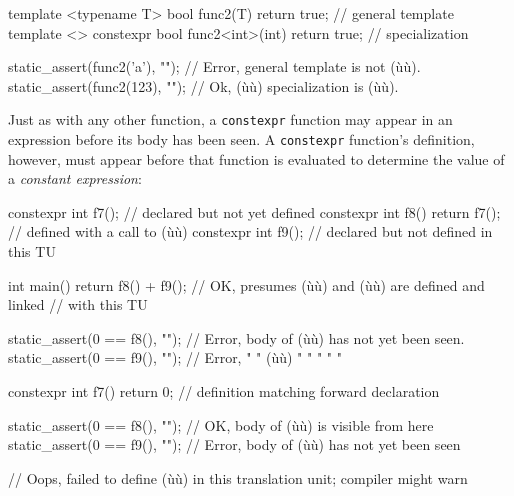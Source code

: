 \begin{emcppslisting}
template <typename T> bool func2(T)        { return true; }  // general template
template <> constexpr bool func2<int>(int) { return true; }  // specialization

static_assert(func2('a'), "");  // Error, general template is not (ù{}ù).
static_assert(func2(123), "");  // Ok, (ù{}ù) specialization is (ù{}ù).
\end{emcppslisting}


\noindent Just as with any other function, a \lstinline!constexpr! function may
appear in an expression before its body has been seen. A
\lstinline!constexpr! function's definition, however, must appear before
that function is evaluated to determine the value of a \emph{constant
expression}:

\begin{emcppslisting}
constexpr int f7();                  // declared but not yet defined
constexpr int f8() { return f7(); }  // defined with a call to (ù{}ù)
constexpr int f9();                  // declared but not defined in this TU

int main()
{
    return f8() + f9();  // OK, presumes (ù{}ù) and (ù{}ù) are defined and linked
                         // with this TU
}

static_assert(0 == f8(), "");  // Error, body of (ù{}ù) has not yet been seen.
static_assert(0 == f9(), "");  // Error,   "  "  (ù{}ù)  "   "   "   "     "

constexpr int f7() { return 0; }  // definition matching forward declaration

static_assert(0 == f8(), "");  // OK, body of (ù{}ù) is visible from here
static_assert(0 == f9(), "");  // Error, body of (ù{}ù) has not yet been seen

// Oops, failed to define (ù{}ù) in this translation unit; compiler might warn
\end{emcppslisting}


